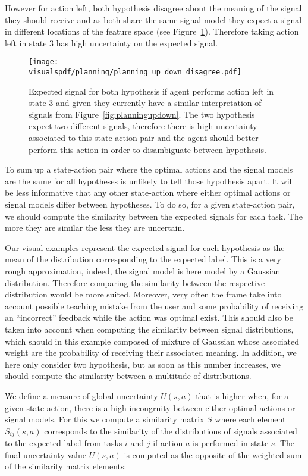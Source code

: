 However for action left, both hypothesis disagree about the meaning of the signal they should receive and as both share the same signal model they expect a signal in different locations of the feature space (see Figure~\ref{fig:uncertaintysignalupdowndisagree}). Therefore taking action left in state 3 has high uncertainty on the expected signal.

\begin{figure}[!ht]
  \centering
  \texttt{[image: \\visualspdf/planning/planning\_up\_down\_disagree.pdf]}
  \caption{Expected signal for both hypothesis if agent performs action left in state 3 and given they currently have a similar interpretation of signals from Figure~\ref{fig:planningupdown}. The two hypothesis expect two different signals, therefore there is high uncertainty associated to this state-action pair and the agent should better perform this action in order to disambiguate between hypothesis.}
  \label{fig:uncertaintysignalupdowndisagree}
\end{figure}


To sum up a state-action pair where the optimal actions and the signal models are the same for all hypotheses is unlikely to tell those hypothesis apart. It will be less informative that any other state-action where either optimal actions or signal models differ between hypotheses. To do so, for a given state-action pair, we should compute the similarity between the expected signals for each task. The more they are similar the less they are uncertain.

Our visual examples represent the expected signal for each hypothesis as the mean of the distribution corresponding to the expected label. This is a very rough approximation, indeed, the signal model is here model by a Gaussian distribution. Therefore comparing the similarity between the respective distribution would be more suited. Moreover, very often the frame take into account possible teaching mistake from the user and some probability of receiving an ``incorrect'' feedback while the action was optimal exist. This should also be taken into account when computing the similarity between signal distributions, which should in this example composed of mixture of Gaussian whose associated weight are the probability of receiving their associated meaning. In addition, we here only consider two hypothesis, but as soon as this number increases, we should compute the similarity between a multitude of distributions. 

We define a measure of global uncertainty $U(s,a)$ that is higher when, for a given state-action, there is a high incongruity between either optimal actions or signal models. For this we compute a similarity matrix $S$ where each element $S_{ij}(s,a)$ corresponds to the similarity of the distributions of signals associated to the expected label from tasks $i$ and $j$ if action $a$ is performed in state $s$. The final uncertainty value $U(s,a)$ is computed as the opposite of the weighted sum of the similarity matrix elements:

